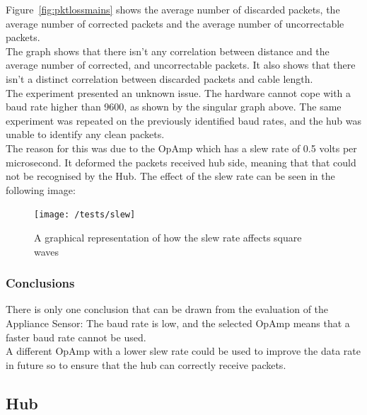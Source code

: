 \documentclass[preprint,12pt,3p]{elsarticle}
\begin{document}
Figure~\ref{fig:pktlossmains} shows the average number of discarded packets, the average number of corrected packets and the average number of uncorrectable packets.\\
The graph shows that there isn't any correlation between distance and the average number of corrected, and uncorrectable packets. It also shows that there isn't a distinct correlation between discarded packets and cable length.\\
The experiment presented an unknown issue. The hardware cannot cope with a baud rate higher than 9600, as shown by the singular graph above. The same experiment was repeated on the previously identified baud rates, and the hub was unable to identify any clean packets.\\
The reason for this was due to the OpAmp which has a slew rate of 0.5 volts per microsecond. It deformed the packets received hub side, meaning that that could not be recognised by the Hub. The effect of the slew rate can be seen in the following image:
\begin{figure}[H]
    \centering
    \texttt{[image: /tests/slew]}
    \caption {A graphical representation of how the slew rate affects square waves~\cite{slew}}
\end{figure}

\subsubsection{Conclusions}
There is only one conclusion that can be drawn from the evaluation of the Appliance Sensor: The baud rate is low, and the selected OpAmp means that a faster baud rate cannot be used.\\
A different OpAmp with a lower slew rate could be used to improve the data rate in future so to ensure that the hub can correctly receive packets.

\clearpage
\subsection{Hub}
\end{document}
